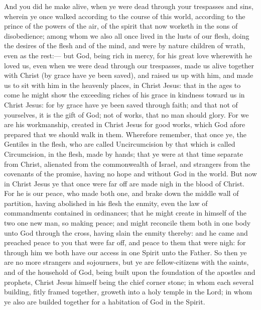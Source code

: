 And you did he make alive, when ye were dead through your trespasses and sins, wherein ye once walked according to the course of this world, according to the prince of the powers of the air, of the spirit that now worketh in the sons of disobedience; among whom we also all once lived in the lusts of our flesh, doing the desires of the flesh and of the mind, and were by nature children of wrath, even as the rest:— but God, being rich in mercy, for his great love wherewith he loved us, even when we were dead through our trespasses, made us alive together with Christ (by grace have ye been saved), and raised us up with him, and made us to sit with him in the heavenly places, in Christ Jesus: that in the ages to come he might show the exceeding riches of his grace in kindness toward us in Christ Jesus: for by grace have ye been saved through faith; and that not of yourselves, it is the gift of God; not of works, that no man should glory. For we are his workmanship, created in Christ Jesus for good works, which God afore prepared that we should walk in them.  Wherefore remember, that once ye, the Gentiles in the flesh, who are called Uncircumcision by that which is called Circumcision, in the flesh, made by hands; that ye were at that time separate from Christ, alienated from the commonwealth of Israel, and strangers from the covenants of the promise, having no hope and without God in the world. But now in Christ Jesus ye that once were far off are made nigh in the blood of Christ. For he is our peace, who made both one, and brake down the middle wall of partition, having abolished in his flesh the enmity, even the law of commandments contained in ordinances; that he might create in himself of the two one new man, so making peace; and might reconcile them both in one body unto God through the cross, having slain the enmity thereby: and he came and preached peace to you that were far off, and peace to them that were nigh: for through him we both have our access in one Spirit unto the Father. So then ye are no more strangers and sojourners, but ye are fellow-citizens with the saints, and of the household of God, being built upon the foundation of the apostles and prophets, Christ Jesus himself being the chief corner stone; in whom each several building, fitly framed together, groweth into a holy temple in the Lord; in whom ye also are builded together for a habitation of God in the Spirit. 

